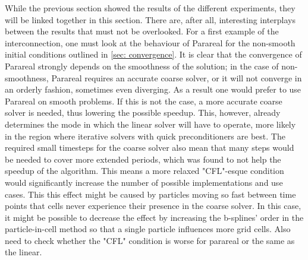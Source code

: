 
While the previous section showed the results of the different experiments, they will be linked together in this section. There are, after all, interesting interplays between the results that must not be overlooked. For a first example of the interconnection, one must look at the behaviour of Parareal for the non-smooth initial conditions outlined in \ref{sec: convergence}. It is clear that the convergence of Parareal strongly depends on the smoothness of the solution; in the case of non-smoothness, Parareal requires an accurate coarse solver, or it will not converge in an orderly fashion, sometimes even diverging. As a result one would prefer to use Parareal on smooth problems. If this is not the case, a more accurate coarse solver is needed, thus lowering the possible speedup. This, however, already determines the mode in which the linear solver will have to operate, more likely in the region where iterative solvers with quick preconditioners are best. The required small timesteps for the coarse solver also mean that many steps would be needed to cover more extended periods, which was found to not help the speedup of the algorithm. This means a more relaxed "CFL"-esque condition would significantly increase the number of possible implementations and use cases. \color{red} This this effect might be caused by particles moving so fast between time points that cells never experience their presence in the coarse solver. In this case, it might be possible to decrease the effect by increasing the b-splines' order in the particle-in-cell method so that a single particle influences more grid cells. Also need to check whether the "CFL" condition is worse for parareal or the same as the linear.\color{black}

